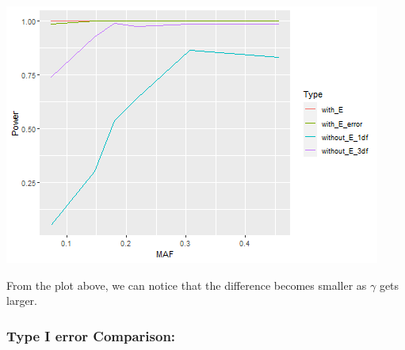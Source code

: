 \documentclass[
]{article}
\newenvironment{Shaded}{\begin{snugshade}}{\end{snugshade}}
\newcommand{\CommentTok}[1]{\textcolor[rgb]{0.56,0.35,0.01}{\textit{#1}}}
\newcommand{\DataTypeTok}[1]{\textcolor[rgb]{0.13,0.29,0.53}{#1}}
\newcommand{\DecValTok}[1]{\textcolor[rgb]{0.00,0.00,0.81}{#1}}
\newcommand{\KeywordTok}[1]{\textcolor[rgb]{0.13,0.29,0.53}{\textbf{#1}}}
\newcommand{\NormalTok}[1]{#1}
\newcommand{\OperatorTok}[1]{\textcolor[rgb]{0.81,0.36,0.00}{\textbf{#1}}}
\newcommand{\StringTok}[1]{\textcolor[rgb]{0.31,0.60,0.02}{#1}}
\begin{document}
\begin{Shaded}
\end{Shaded}

\includegraphics{stats-gene-research-progress-v9_files/figure-latex/unnamed-chunk-9-1.png}

From the plot above, we can notice that the difference becomes smaller
as \(\gamma\) gets larger.

\clearpage

\hypertarget{type-i-error-comparison-1}{%
\subsubsection{Type I error
Comparison:}\label{type-i-error-comparison-1}}
\end{document}
